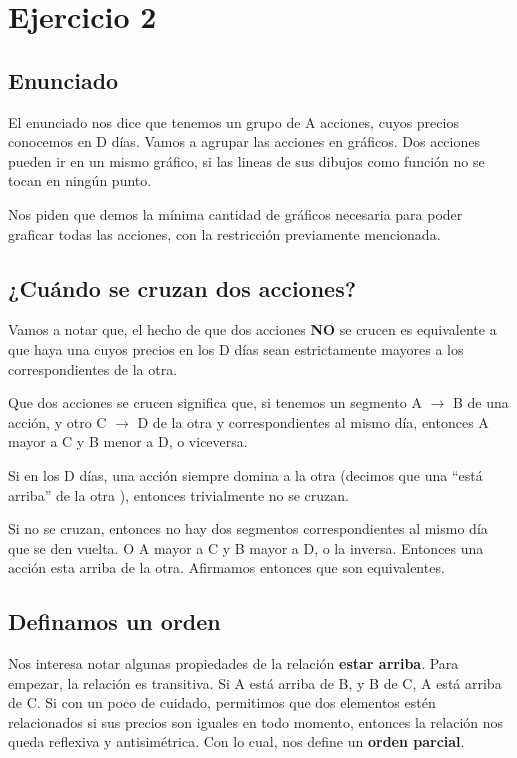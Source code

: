 \section{Ejercicio 2}

\subsection{Enunciado}

\par{El enunciado nos dice que tenemos un grupo de A acciones, cuyos precios conocemos en D días. 
Vamos a agrupar las acciones en gráficos. Dos acciones pueden ir en un mismo gráfico, si las lineas de sus dibujos
como función no se tocan en ningún punto.}
\par{Nos piden que demos la mínima cantidad de gráficos necesaria para poder graficar todas las acciones, con 
la restricción previamente mencionada.} 

\subsection{¿Cuándo se cruzan dos acciones?}

\par{Vamos a notar que, el hecho de que dos acciones \textbf{NO} se crucen es equivalente a que 
haya una cuyos precios en los D días sean estrictamente mayores a los correspondientes de la otra.}

\par{Que dos acciones se crucen significa que, si tenemos un segmento A $\rightarrow$ B de una acción, 
y otro C $\rightarrow$ D de la otra y correspondientes al mismo día,  entonces A mayor a C y B menor a D, o viceversa.} 

\par{Si en los D días, una acción siempre domina a la otra (decimos que una ``está arriba'' de la otra ), entonces trivialmente no se cruzan.}

\par{Si no se cruzan, entonces no hay dos segmentos correspondientes al mismo día que se den vuelta. 
O A mayor a C y B mayor a D, o la inversa. Entonces una acción esta arriba de la otra. Afirmamos entonces que son equivalentes.}

\subsection{Definamos un orden}

\par{Nos interesa notar algunas propiedades de la relación \textbf{estar arriba}. Para empezar, 
la relación es transitiva. Si A está arriba de B, y B de C, A está arriba de C.
Si con un poco de cuidado, permitimos que dos elementos estén relacionados si sus precios son iguales en todo momento, entonces
la relación nos queda reflexiva y antisimétrica. Con lo cual, nos define un \textbf{orden parcial}. }


